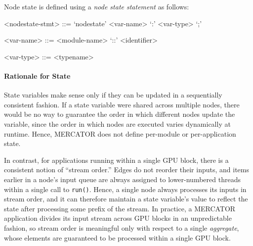 \documentclass[11pt]{article}
\begin{document}
Node state is defined using a \textit{node state statement} as follows:
\begin{grammar}

<nodestate-stmt> ::= `nodestate' <var-name> `:' <var-type> `;'

<var-name> ::= <module-name> `::' <identifier>

<var-type> ::= <typename>

\end{grammar}

\paragraph*{Rationale for State}
State variables make sense only if they can be updated in a
sequentially consistent fashion. If a state variable were shared
across multiple nodes, there would be no way to guarantee the order
in which different nodes update the variable, since the order in
which nodes are executed varies dynamically at runtime.  Hence,
MERCATOR does not define per-module or per-application state.

In contrast, for applications running within a single GPU block, there
is a consistent notion of ``stream order.''  Edges do not reorder
their inputs, and items earlier in a node's input queue are always
assigned to lower-numbered threads within a single call to
\texttt{run()}.  Hence, a single node always processes its inputs in
stream order, and it can therefore maintain a state variable's value
to reflect the state after processing some prefix of the stream.  In
practice, a MERCATOR application divides its input stream across GPU
blocks in an unpredictable fashion, so stream order is meaningful only
with respect to a single \emph{aggregate}, whose elements are
guaranteed to be processed within a single GPU block.

\begin{comment}

Moreover, for applications with cycles, MERCATOR does not guarantee
that items that enter a cycle first will exit the cycle first, since
any one item may go around the cycle a variable number of times.
Waiting for earlier items to exit the cycle before accepting later
items could have a serious negative impact on thread occupancy, since
one long-lived item would prevent any later items from being
processed.  A somewhat performance-preserving solution would be to
reorder items into stream order as they exit the cycle, using a
reorder buffer.

\end{comment}
\end{document}
